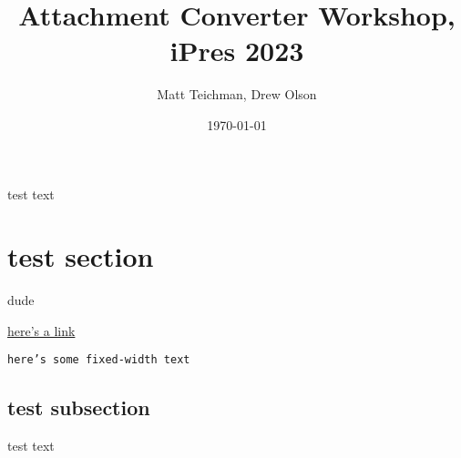 \documentclass[11pt]{article}
\author{Matt Teichman, Drew Olson}
\date{\today}
\title{Attachment Converter Workshop, iPres 2023}
\begin{document}
\maketitle
\tableofcontents

test text

\section{test section}
\label{sec:orge90efe2}

dude

\href{https://gnu.org}{here's a link}

\texttt{here's some fixed-width text}

\subsection{test subsection}
\label{sec:org9d96b5d}

test text
\end{document}
